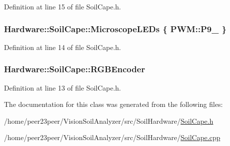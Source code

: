 Definition at line 15 of file Soil\+Cape.\+h.

\hypertarget{class_hardware_1_1_soil_cape_a80d499485dddb861cddaffa439b655dd}{}
\subsubsection[{Microscope\+L\+E\+Ds}]{ Hardware\+::\+Soil\+Cape\+::\+Microscope\+L\+E\+Ds \{ {\bf P\+W\+M\+::\+P9\+\_} \}}\label{class_hardware_1_1_soil_cape_a80d499485dddb861cddaffa439b655dd}


Definition at line 14 of file Soil\+Cape.\+h.

\hypertarget{class_hardware_1_1_soil_cape_a0e68dc6f30fdcbff0462d2996e47a338}{}
\subsubsection[{R\+G\+B\+Encoder}]{ Hardware\+::\+Soil\+Cape\+::\+R\+G\+B\+Encoder}\label{class_hardware_1_1_soil_cape_a0e68dc6f30fdcbff0462d2996e47a338}


Definition at line 13 of file Soil\+Cape.\+h.



The documentation for this class was generated from the following files\+:\begin{DoxyCompactItemize}
\item 
/home/peer23peer/\+Vision\+Soil\+Analyzer/src/\+Soil\+Hardware/\hyperlink{_soil_cape_8h}{Soil\+Cape.\+h}\item 
/home/peer23peer/\+Vision\+Soil\+Analyzer/src/\+Soil\+Hardware/\hyperlink{_soil_cape_8cpp}{Soil\+Cape.\+cpp}\end{DoxyCompactItemize}
